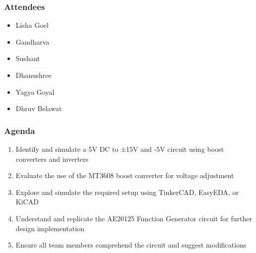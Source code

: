 \documentclass[12pt,a4paper]{article}
\begin{document}
\subsubsection*{Attendees}
\begin{itemize}
    \item Lisha Goel
    \item Gandharva
    \item Sushant
    \item Dhanushree
    \item Yagya Goyal
    \item Dhruv Belawat
\end{itemize}

\subsubsection*{Agenda}
\begin{enumerate}
    \item Identify and simulate a 5V DC to ±15V and -5V circuit using boost converters and inverters
    \item Evaluate the use of the MT3608 boost converter for voltage adjustment
    \item Explore and simulate the required setup using TinkerCAD, EasyEDA, or KiCAD
    \item Understand and replicate the AE20125 Function Generator circuit for further design implementation
    \item Ensure all team members comprehend the circuit and suggest modifications
\end{enumerate}
\end{document}

